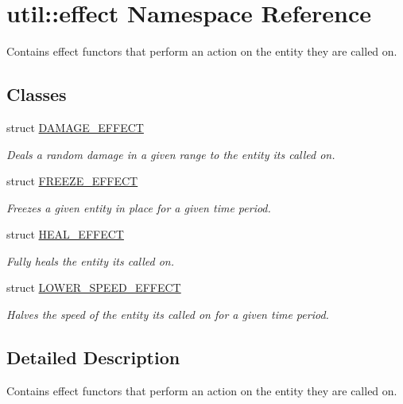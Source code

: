 \hypertarget{namespaceutil_1_1effect}{}\section{util\+:\+:effect Namespace Reference}
\label{namespaceutil_1_1effect}


Contains effect functors that perform an action on the entity they are called on.  


\subsection*{Classes}
\begin{DoxyCompactItemize}
\item 
struct \hyperlink{structutil_1_1effect_1_1_d_a_m_a_g_e___e_f_f_e_c_t}{D\+A\+M\+A\+G\+E\+\_\+\+E\+F\+F\+E\+CT}
\begin{DoxyCompactList}\small\item\em Deals a random damage in a given range to the entity it\textquotesingle{}s called on. \end{DoxyCompactList}\item 
struct \hyperlink{structutil_1_1effect_1_1_f_r_e_e_z_e___e_f_f_e_c_t}{F\+R\+E\+E\+Z\+E\+\_\+\+E\+F\+F\+E\+CT}
\begin{DoxyCompactList}\small\item\em Freezes a given entity in place for a given time period. \end{DoxyCompactList}\item 
struct \hyperlink{structutil_1_1effect_1_1_h_e_a_l___e_f_f_e_c_t}{H\+E\+A\+L\+\_\+\+E\+F\+F\+E\+CT}
\begin{DoxyCompactList}\small\item\em Fully heals the entity it\textquotesingle{}s called on. \end{DoxyCompactList}\item 
struct \hyperlink{structutil_1_1effect_1_1_l_o_w_e_r___s_p_e_e_d___e_f_f_e_c_t}{L\+O\+W\+E\+R\+\_\+\+S\+P\+E\+E\+D\+\_\+\+E\+F\+F\+E\+CT}
\begin{DoxyCompactList}\small\item\em Halves the speed of the entity it\textquotesingle{}s called on for a given time period. \end{DoxyCompactList}\end{DoxyCompactItemize}


\subsection{Detailed Description}
Contains effect functors that perform an action on the entity they are called on. 